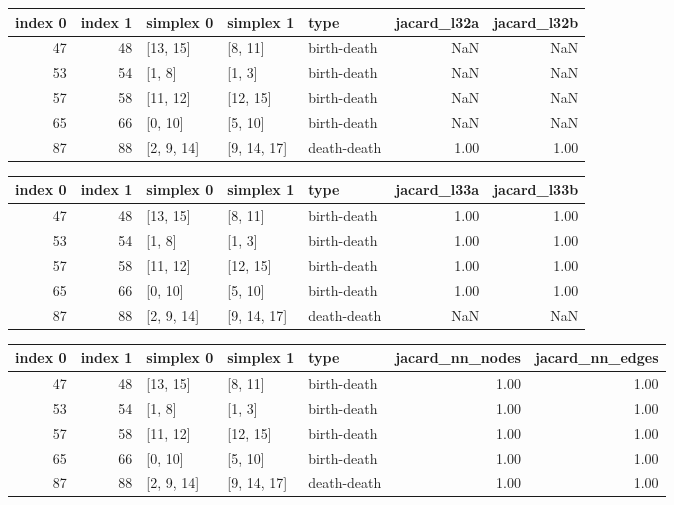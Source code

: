 \documentclass{article}
\begin{document}
\begin{center}
\begin{tabular}{rrlllrr}
\toprule
index 0 & index 1 & simplex 0 & simplex 1 & type & jacard\_l32a & jacard\_l32b \\
\midrule
47 & 48 & [13, 15] & [8, 11] & birth-death & NaN & NaN \\
53 & 54 & [1, 8] & [1, 3] & birth-death & NaN & NaN \\
57 & 58 & [11, 12] & [12, 15] & birth-death & NaN & NaN \\
65 & 66 & [0, 10] & [5, 10] & birth-death & NaN & NaN \\
87 & 88 & [2, 9, 14] & [9, 14, 17] & death-death & 1.00 & 1.00 \\
\bottomrule
\end{tabular}
\end{center}

\begin{center}
\begin{tabular}{rrlllrr}
\toprule
index 0 & index 1 & simplex 0 & simplex 1 & type & jacard\_l33a & jacard\_l33b \\
\midrule
47 & 48 & [13, 15] & [8, 11] & birth-death & 1.00 & 1.00 \\
53 & 54 & [1, 8] & [1, 3] & birth-death & 1.00 & 1.00 \\
57 & 58 & [11, 12] & [12, 15] & birth-death & 1.00 & 1.00 \\
65 & 66 & [0, 10] & [5, 10] & birth-death & 1.00 & 1.00 \\
87 & 88 & [2, 9, 14] & [9, 14, 17] & death-death & NaN & NaN \\
\bottomrule
\end{tabular}
\end{center}

\begin{center}
\begin{tabular}{rrlllrr}
\toprule
index 0 & index 1 & simplex 0 & simplex 1 & type & jacard\_nn\_nodes & jacard\_nn\_edges \\
\midrule
47 & 48 & [13, 15] & [8, 11] & birth-death & 1.00 & 1.00 \\
53 & 54 & [1, 8] & [1, 3] & birth-death & 1.00 & 1.00 \\
57 & 58 & [11, 12] & [12, 15] & birth-death & 1.00 & 1.00 \\
65 & 66 & [0, 10] & [5, 10] & birth-death & 1.00 & 1.00 \\
87 & 88 & [2, 9, 14] & [9, 14, 17] & death-death & 1.00 & 1.00 \\
\bottomrule
\end{tabular}
\end{center}
\end{document}
